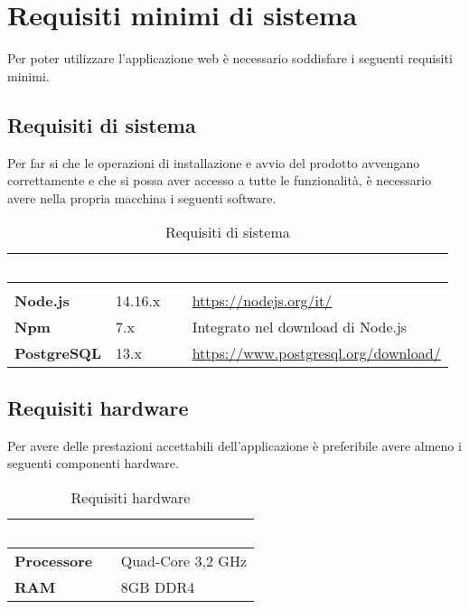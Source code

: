 \section{Requisiti minimi di sistema}
Per poter utilizzare l'applicazione web \NomeProgetto{} è necessario soddisfare i seguenti requisiti minimi.
\subsection{Requisiti di sistema}
Per far si che le operazioni di installazione e avvio del prodotto avvengano correttamente e che si possa aver accesso a tutte le funzionalità, è necessario avere nella propria macchina i seguenti software.
{
\setlength\arrayrulewidth{0.95pt}
\renewcommand{\arraystretch}{1.5}
\begin{longtable}{C{3cm} | C{3cm} | C{9cm}}

\textcolor{white}{\textbf{Software}}&
\textcolor{white}{\textbf{Versione}}&
\textcolor{white}{\textbf{Riferimento per il downlaod}} \\
\endfirsthead
{}\\
\endfoot
{}\caption{Requisiti di sistema}
\endlastfoot
	
	\textbf{Node.js} &
	14.16.x &
	\textcolor{blue}{\url{https://nodejs.org/it/}} \\
 
	\textbf{Npm} & 
	7.x &
	Integrato nel download di Node.js \\
	
	\textbf{PostgreSQL} &
	13.x &
	\textcolor{blue}{\url{https://www.postgresql.org/download/}} \\
\end{longtable}	

}
\subsection{Requisiti hardware}
Per avere delle prestazioni accettabili dell'applicazione è preferibile avere almeno i seguenti componenti hardware.
{
\setlength\arrayrulewidth{0.95pt}
\renewcommand{\arraystretch}{1.5}
\begin{longtable}{C{4cm} | C{4cm}}

\textcolor{white}{\textbf{Componente}}&
\textcolor{white}{\textbf{Requisito}} \\
\endfirsthead
\endfoot
{}\caption{Requisiti hardware}
\endlastfoot
	
	\textbf{Processore} &
	 Quad-Core 3,2 GHz \\
 
	\textbf{RAM} & 
	8GB DDR4 \\

\end{longtable}	
}

